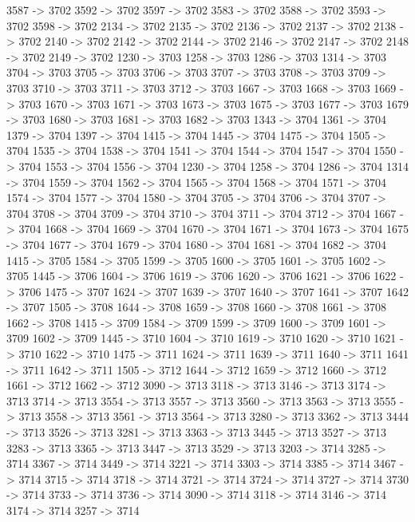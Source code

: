 {	3587 -> 3702
	3592 -> 3702
	3597 -> 3702
	3583 -> 3702
	3588 -> 3702
	3593 -> 3702
	3598 -> 3702
	2134 -> 3702
	2135 -> 3702
	2136 -> 3702
	2137 -> 3702
	2138 -> 3702
	2140 -> 3702
	2142 -> 3702
	2144 -> 3702
	2146 -> 3702
	2147 -> 3702
	2148 -> 3702
	2149 -> 3702
	1230 -> 3703
	1258 -> 3703
	1286 -> 3703
	1314 -> 3703
	3704 -> 3703
	3705 -> 3703
	3706 -> 3703
	3707 -> 3703
	3708 -> 3703
	3709 -> 3703
	3710 -> 3703
	3711 -> 3703
	3712 -> 3703
	1667 -> 3703
	1668 -> 3703
	1669 -> 3703
	1670 -> 3703
	1671 -> 3703
	1673 -> 3703
	1675 -> 3703
	1677 -> 3703
	1679 -> 3703
	1680 -> 3703
	1681 -> 3703
	1682 -> 3703
	1343 -> 3704
	1361 -> 3704
	1379 -> 3704
	1397 -> 3704
	1415 -> 3704
	1445 -> 3704
	1475 -> 3704
	1505 -> 3704
	1535 -> 3704
	1538 -> 3704
	1541 -> 3704
	1544 -> 3704
	1547 -> 3704
	1550 -> 3704
	1553 -> 3704
	1556 -> 3704
	1230 -> 3704
	1258 -> 3704
	1286 -> 3704
	1314 -> 3704
	1559 -> 3704
	1562 -> 3704
	1565 -> 3704
	1568 -> 3704
	1571 -> 3704
	1574 -> 3704
	1577 -> 3704
	1580 -> 3704
	3705 -> 3704
	3706 -> 3704
	3707 -> 3704
	3708 -> 3704
	3709 -> 3704
	3710 -> 3704
	3711 -> 3704
	3712 -> 3704
	1667 -> 3704
	1668 -> 3704
	1669 -> 3704
	1670 -> 3704
	1671 -> 3704
	1673 -> 3704
	1675 -> 3704
	1677 -> 3704
	1679 -> 3704
	1680 -> 3704
	1681 -> 3704
	1682 -> 3704
	1415 -> 3705
	1584 -> 3705
	1599 -> 3705
	1600 -> 3705
	1601 -> 3705
	1602 -> 3705
	1445 -> 3706
	1604 -> 3706
	1619 -> 3706
	1620 -> 3706
	1621 -> 3706
	1622 -> 3706
	1475 -> 3707
	1624 -> 3707
	1639 -> 3707
	1640 -> 3707
	1641 -> 3707
	1642 -> 3707
	1505 -> 3708
	1644 -> 3708
	1659 -> 3708
	1660 -> 3708
	1661 -> 3708
	1662 -> 3708
	1415 -> 3709
	1584 -> 3709
	1599 -> 3709
	1600 -> 3709
	1601 -> 3709
	1602 -> 3709
	1445 -> 3710
	1604 -> 3710
	1619 -> 3710
	1620 -> 3710
	1621 -> 3710
	1622 -> 3710
	1475 -> 3711
	1624 -> 3711
	1639 -> 3711
	1640 -> 3711
	1641 -> 3711
	1642 -> 3711
	1505 -> 3712
	1644 -> 3712
	1659 -> 3712
	1660 -> 3712
	1661 -> 3712
	1662 -> 3712
	3090 -> 3713
	3118 -> 3713
	3146 -> 3713
	3174 -> 3713
	3714 -> 3713
	3554 -> 3713
	3557 -> 3713
	3560 -> 3713
	3563 -> 3713
	3555 -> 3713
	3558 -> 3713
	3561 -> 3713
	3564 -> 3713
	3280 -> 3713
	3362 -> 3713
	3444 -> 3713
	3526 -> 3713
	3281 -> 3713
	3363 -> 3713
	3445 -> 3713
	3527 -> 3713
	3283 -> 3713
	3365 -> 3713
	3447 -> 3713
	3529 -> 3713
	3203 -> 3714
	3285 -> 3714
	3367 -> 3714
	3449 -> 3714
	3221 -> 3714
	3303 -> 3714
	3385 -> 3714
	3467 -> 3714
	3715 -> 3714
	3718 -> 3714
	3721 -> 3714
	3724 -> 3714
	3727 -> 3714
	3730 -> 3714
	3733 -> 3714
	3736 -> 3714
	3090 -> 3714
	3118 -> 3714
	3146 -> 3714
	3174 -> 3714
	3257 -> 3714
}
